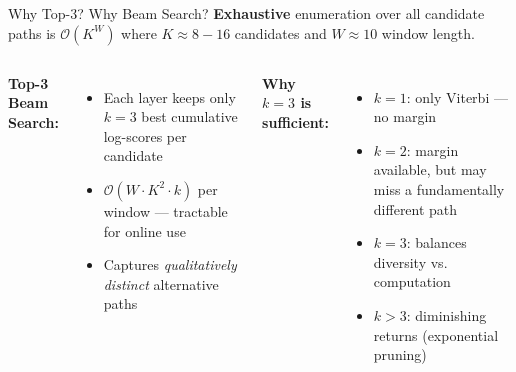 \documentclass[10pt,aspectratio=169]{beamer}
\begin{document}
\begin{frame}{Why Top-3? Why Beam Search?}
  \textbf{Exhaustive} enumeration over all candidate paths is $\mathcal{O}(K^W)$
  where $K \approx 8-16$ candidates and $W \approx 10$ window length.

  \vspace{0.4cm}
  \begin{columns}[T]
      \textbf{Top-3 Beam Search:}
      \begin{itemize}
        \item Each layer keeps only $k=3$ best cumulative log-scores per candidate
        \item $\mathcal{O}(W \cdot K^2 \cdot k)$ per window — tractable for online use
        \item Captures \emph{qualitatively distinct} alternative paths
      \end{itemize}

      \textbf{Why $k=3$ is sufficient:}
      \begin{itemize}
        \item $k=1$: only Viterbi — no margin
        \item $k=2$: margin available, but may miss a fundamentally different path
        \item $k=3$: balances diversity vs. computation
        \item $k > 3$: diminishing returns (exponential pruning)
      \end{itemize}
  \end{columns}

  \vspace{0.4cm}
  \begin{center}
  \end{center}
\end{frame}
\end{document}
